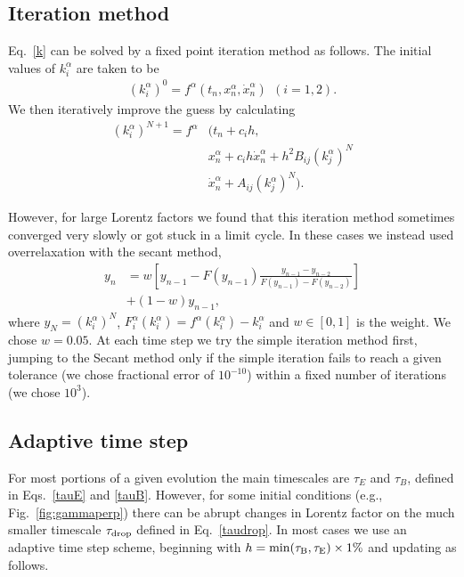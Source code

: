 \documentclass[amsmath,amssymb,nofootinbib,notitlepage,superscriptaddress,twocolumn]{revtex4-2}
\begin{document}
\subsection*{Iteration method}
Eq.~\eqref{k} can be solved by a fixed point iteration method as follows.  The initial values of $k^{\alpha}_i$ are taken to be
\begin{align}
    (k^{\alpha}_i)^0=f^{\alpha}(t_n, x^{\alpha}_n, \Dot{x}_n^{\alpha}) \ \ (i=1,2).
\end{align}
We then iteratively improve the guess by calculating
\begin{align}\label{iter_k}
    (k^{\alpha}_i)^{N+1}=f^{\alpha}&\big(t_n+c_i h, \nonumber \\ & x^{\alpha}_n+c_i h \Dot{x}_n^{\alpha}+h^2 B_{ij}(k^{\alpha}_j)^{N} \nonumber \\ &
    \Dot{x}_n^{\alpha}+A_{ij}(k^{\alpha}_j)^{N} \big).
\end{align}

However, for large Lorentz factors we found that this iteration method sometimes converged very slowly or got stuck in a limit cycle.  In these cases we instead used overrelaxation with the secant method,
\begin{align}
    y_n& = w\left[y_{n-1}-F(y_{n-1})\frac{y_{n-1}-y_{n-2}}{F(y_{n-1})-F(y_{n-2})}\right] \\ & +(1-w)y_{n-1},
\end{align}
where $y_N=(k_i^{\alpha})^{N}$, $F^{\alpha}_i(k_i^{\alpha})=f^{\alpha}(k^{\alpha}_i)-k_i^{\alpha}$ and $w \in [0,1]$ is the weight.  We chose $w=0.05$.  At each time step we try the simple iteration method first, jumping to the Secant method only if the simple iteration fails to reach a given tolerance (we chose fractional error of $10^{-10}$) within a fixed number of iterations (we chose $10^3$).

\subsection{Adaptive time step}

For most portions of a given evolution the main timescales are $\tau_E$ and $\tau_B$, defined in Eqs.~\eqref{tauE} and \eqref{tauB}.  However, for some initial conditions (e.g., Fig.~\ref{fig:gammaperp}) there can be abrupt changes in Lorentz factor on the much smaller timescale $\tau_{\rm drop}$ defined in Eq.~\eqref{taudrop}.  In most cases we use an adaptive time step scheme, beginning with $h=\rm{min}(\tau_B,\tau_E)\times 1\%$ and updating as follows.
\end{document}

